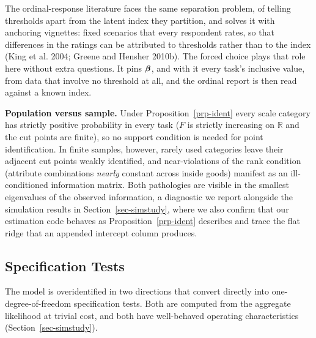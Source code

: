 \documentclass[
  letterpaper,
  DIV=11,
  numbers=noendperiod]{scrartcl}
\theoremstyle{plain}
\theoremstyle{plain}
\theoremstyle{plain}
\theoremstyle{remark}
\begin{document}
The ordinal-response literature faces the same separation problem, of
telling thresholds apart from the latent index they partition, and
solves it with anchoring vignettes: fixed scenarios that every
respondent rates, so that differences in the ratings can be attributed
to thresholds rather than to the index (King et al. 2004; Greene and
Hensher 2010b). The forced choice plays that role here without extra
questions. It pins \(\boldsymbol{\beta}\), and with it every task's inclusive
value, from data that involve no threshold at all, and the ordinal
report is then read against a known index.

\textbf{Population versus sample.} Under Proposition~\ref{prp-ident}
every scale category has strictly positive probability in every task
(\(F\) is strictly increasing on \(\mathbb{R}\) and the cut points are
finite), so no support condition is needed for point identification. In
finite samples, however, rarely used categories leave their adjacent cut
points weakly identified, and near-violations of the rank condition
(attribute combinations \emph{nearly} constant across inside goods)
manifest as an ill-conditioned information matrix. Both pathologies are
visible in the smallest eigenvalues of the observed information, a
diagnostic we report alongside the simulation results in
Section~\ref{sec-simstudy}, where we also confirm that our estimation
code behaves as Proposition~\ref{prp-ident} describes and trace the flat
ridge that an appended intercept column produces.

\subsection{Specification Tests}\label{sec-spectests}

The model is overidentified in two directions that convert directly into
one-degree-of-freedom specification tests. Both are computed from the
aggregate likelihood at trivial cost, and both have well-behaved
operating characteristics (Section~\ref{sec-simstudy}).
\end{document}

